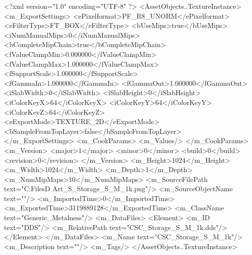 <?xml version="1.0" encoding="UTF-8" ?>
<AssetObjects..TextureInstance>
	<m_ExportSettings>
		<ePixelformat>PF_R8_UNORM</ePixelformat>
		<eFilterType>FT_BOX</eFilterType>
		<bUseMips>true</bUseMips>
		<iNumManualMips>0</iNumManualMips>
		<bCompleteMipChain>true</bCompleteMipChain>
		<fValueClampMin>0.000000</fValueClampMin>
		<fValueClampMax>1.000000</fValueClampMax>
		<fSupportScale>1.000000</fSupportScale>
		<fGammaIn>1.000000</fGammaIn>
		<fGammaOut>1.000000</fGammaOut>
		<iSlabWidth>0</iSlabWidth>
		<iSlabHeight>0</iSlabHeight>
		<iColorKeyX>64</iColorKeyX>
		<iColorKeyY>64</iColorKeyY>
		<iColorKeyZ>64</iColorKeyZ>
		<eExportMode>TEXTURE_2D</eExportMode>
		<bSampleFromTopLayer>false</bSampleFromTopLayer>
	</m_ExportSettings>
	<m_CookParams>
		<m_Values/>
	</m_CookParams>
	<m_Version>
		<major>1</major>
		<minor>0</minor>
		<build>0</build>
		<revision>0</revision>
	</m_Version>
	<m_Height>1024</m_Height>
	<m_Width>1024</m_Width>
	<m_Depth>1</m_Depth>
	<m_NumMipMaps>10</m_NumMipMaps>
	<m_SourceFilePath text="C:\Users\Shadow\Desktop\Working Files\3D Art\Storage_S\CSC_Storage_S_M_1k.png"/>
	<m_SourceObjectName text=""/>
	<m_ImportedTime>0</m_ImportedTime>
	<m_ExportedTime>3119889128</m_ExportedTime>
	<m_ClassName text="Generic_Metalness"/>
	<m_DataFiles>
		<Element>
			<m_ID text="DDS"/>
			<m_RelativePath text="CSC_Storage_S_M_1k.dds"/>
		</Element>
	</m_DataFiles>
	<m_Name text="CSC_Storage_S_M_1k"/>
	<m_Description text=""/>
	<m_Tags/>
</AssetObjects..TextureInstance>

